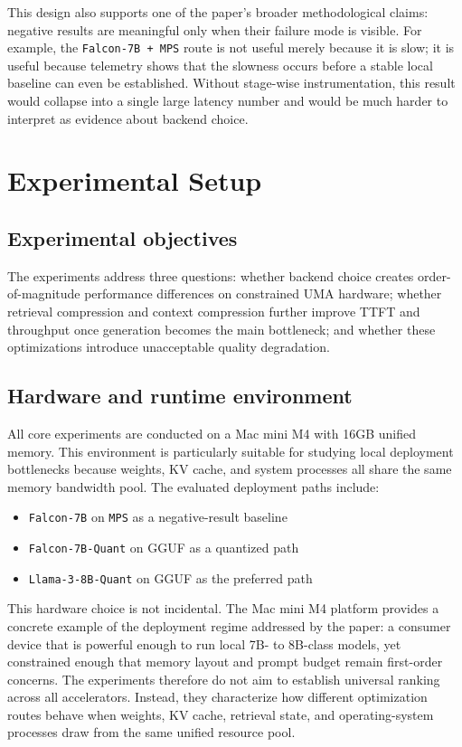 \documentclass[10pt,twocolumn]{article}
\begin{document}
This design also supports one of the paper's broader methodological claims: negative results are meaningful only when their failure mode is visible. For example, the \texttt{Falcon-7B + MPS} route is not useful merely because it is slow; it is useful because telemetry shows that the slowness occurs before a stable local baseline can even be established. Without stage-wise instrumentation, this result would collapse into a single large latency number and would be much harder to interpret as evidence about backend choice.

\section{Experimental Setup}

\subsection{Experimental objectives}

The experiments address three questions: whether backend choice creates order-of-magnitude performance differences on constrained UMA hardware; whether retrieval compression and context compression further improve TTFT and throughput once generation becomes the main bottleneck; and whether these optimizations introduce unacceptable quality degradation.

\subsection{Hardware and runtime environment}

All core experiments are conducted on a Mac mini M4 with 16GB unified memory. This environment is particularly suitable for studying local deployment bottlenecks because weights, KV cache, and system processes all share the same memory bandwidth pool. The evaluated deployment paths include:

\begin{itemize}[leftmargin=1.2em]
    \item \texttt{Falcon-7B} on \texttt{MPS} as a negative-result baseline
    \item \texttt{Falcon-7B-Quant} on GGUF as a quantized path
    \item \texttt{Llama-3-8B-Quant} on GGUF as the preferred path
\end{itemize}

This hardware choice is not incidental. The Mac mini M4 platform provides a concrete example of the deployment regime addressed by the paper: a consumer device that is powerful enough to run local 7B- to 8B-class models, yet constrained enough that memory layout and prompt budget remain first-order concerns. The experiments therefore do not aim to establish universal ranking across all accelerators. Instead, they characterize how different optimization routes behave when weights, KV cache, retrieval state, and operating-system processes draw from the same unified resource pool.
\end{document}
